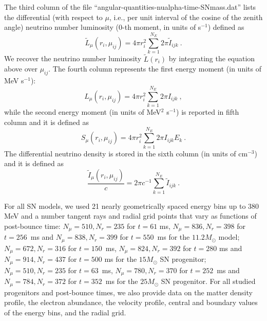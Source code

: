 \documentclass[iop,twocolappendix,numberedappendix]{emulateapj}
\begin{document}
The third column of the file ``angular-quantities-nualpha-time-SNmass.dat''
lists the differential (with respect to $\mu$, i.e., per unit interval of the
cosine of the zenith angle)
neutrino number luminosity (0-th moment, in units of s$^{-1}$)
defined as
\begin{equation}
 \tilde{L}_{\mu}(r_i,\mu_{ij}) = 4 \pi r_i^2 \sum_{k=1}^{N_E} 2 \pi \tilde{I}_{ijk}\ .
\end{equation}
We recover the neutrino number luminosity $\tilde{L}(r_i)$ 
by integrating the equation above over $\mu_{ij}$.
The fourth column represents the first energy moment (in units of MeV s$^{-1}$):
\begin{equation}
 L_{\mu}(r_i,\mu_{ij}) = 4 \pi r_i^2 \sum_{k=1}^{N_E} 2 \pi I_{ijk}\ ,
\label{eq:mom1}
\end{equation}
while the second energy moment (in units of MeV$^2$ s$^{-1}$) is reported in fifth column
and it
is defined as
\begin{equation}
 S_{\mu}(r_i,\mu_{ij}) = 4 \pi r_i^2 \sum_{k=1}^{N_E} 2 \pi I_{ijk} E_k\ .
\label{eq:mom2}
\end{equation}
The differential neutrino density  is stored in the sixth column (in units of cm$^{-3}$) and it is
defined
as
\begin{equation}
\frac{\tilde{I}_{\mu}(r_i,\mu_{ij})}{c} = 2 \pi c^{-1} \sum_{k=1}^{N_E} \tilde{I}_{ijk}\ .
\end{equation}

For all SN models, we used 21 nearly geometrically spaced energy bins up to
380 MeV and a number tangent rays and radial grid points that vary as functions
of post-bounce time: $N_\mu = 510, N_r = 235$  for  $t=61$ ms, $N_\mu = 836,
N_r = 398$ for $t = 256$~ms and $N_\mu = 838, N_r = 399$ for $t = 550$~ms for
the $11.2 M_\odot$ model;  $N_\mu = 672, N_r = 316$  for $t=150$~ms, $N_\mu =
824, N_r = 392$ for $t=280$ ms and $N_\mu = 914, N_r = 437$ for $t=500$ ms
for the $15 M_\odot$ SN progenitor;  $N_\mu = 510, N_r = 235$ for $t=63$~ms,
$N_\mu = 780, N_r = 370$ for $t = 252$~ms and $N_\mu = 784, N_r=372$ for $t =
352$~ms for the $25 M_\odot$ SN progenitor.
For all studied progenitors and post-bounce times, 
we also provide data on the matter density profile, the electron abundance,
the velocity profile, central and boundary values of the energy bins, and the
radial grid.



{}
\end{document}
